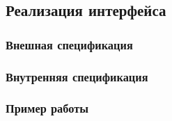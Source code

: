 \subsection{Реализация интерфейса}
\subsubsection{Внешная спецификация}
\subsubsection{Внутренняя спецификация}
\subsubsection{Пример работы}
